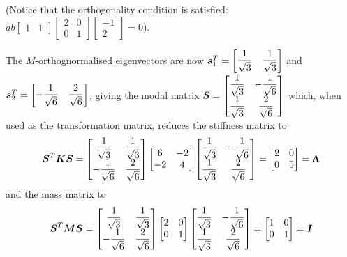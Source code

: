 (Notice that the orthogonality condition is satisfied: 
$ab\begin{bmatrix} 1 & 1 \end{bmatrix}
\begin{bmatrix}
  2 & 0\\
  0 & 1
\end{bmatrix} 
\begin{bmatrix}
  -1 \\
  2
\end{bmatrix}=0$).

The $M$-orthognormalised eigenvectors are now
$\transpose{\vect{s}}_{1}=\begin{bmatrix} \dfrac{1}{\sqrt{3}} &
  \dfrac{1}{\sqrt{3}}\end{bmatrix}$ and $\transpose{\vect{s}}_{2}=
\begin{bmatrix} -\dfrac{1}{\sqrt{6}} &
  \dfrac{2}{\sqrt{6}}\end{bmatrix}$, giving the modal matrix
$\matr{S}=\begin{bmatrix} 
  \dfrac{1}{\sqrt{3}} & -\dfrac{1}{\sqrt{6}} \\ 
  \dfrac{1}{\sqrt{3}} & \dfrac{2}{\sqrt{6}}
 \end{bmatrix}$
 which, when used as the transformation matrix, reduces the stiffness matrix
 to
\begin{displaymath}
  \transpose{\matr{S}}\matr{K}\matr{S}=\begin{bmatrix}
    \dfrac{1}{\sqrt{3}} & \dfrac{1}{\sqrt{3}}\\
   -\dfrac{1}{\sqrt{6}} & \dfrac{2}{\sqrt{6}}
 \end{bmatrix}\begin{bmatrix}
   6  & -2 \\
   -2 & 4
 \end{bmatrix}\begin{bmatrix}
   \dfrac{1}{\sqrt{3}} & -\dfrac{1}{\sqrt{6}} \\
   \dfrac{1}{\sqrt{3}} & \dfrac{2}{\sqrt{6}}
 \end{bmatrix} = \begin{bmatrix}
   2 & 0 \\
   0 & 5
 \end{bmatrix} = \matr{\Lambda}
\end{displaymath}
and the mass matrix to
\begin{displaymath}
  \transpose{\matr{S}}\matr{M}\matr{S}=\begin{bmatrix}
    \dfrac{1}{\sqrt{3}} & \dfrac{1}{\sqrt{3}} \\
    -\dfrac{1}{\sqrt{6}} & \dfrac{2}{\sqrt{6}}
 \end{bmatrix}\begin{bmatrix}
   2 & 0 \\
   0 & 1
 \end{bmatrix}\begin{bmatrix}
   \dfrac{1}{\sqrt{3}} & -\dfrac{1}{\sqrt{6}}\\
   \dfrac{1}{\sqrt{3}} & \dfrac{2}{\sqrt{6}}
 \end{bmatrix} = \begin{bmatrix}
   1 & 0\\
   0 & 1
 \end{bmatrix} = \matr{I}
\end{displaymath}
